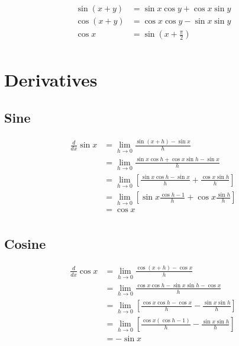 \documentclass[letterpaper, landscape]{exam}
\begin{document}
  \begin{align*}
    \sin(x + y) &= \sin x \cos y + \cos x \sin y \\
    \cos(x + y) &= \cos x \cos y - \sin x \sin y \\
    \cos x &= \sin \left( x + \frac{\pi}{2} \right) \\
  \end{align*}

  \section{Derivatives} %
  
  \subsection{Sine} %
 
  \begin{align*}
    \frac{d}{dx} \sin x & = \lim_{h \to 0} \frac{\sin(x + h) - \sin x}{h} \\
                        & = \lim_{h \to 0} \frac{\sin x \cos h + \cos x \sin h - \sin x}{h} \\
                        & = \lim_{h \to 0} \left[ \frac{\sin x \cos h - \sin x}{h} 
                            + \frac{\cos x \sin h}{h} \right] \\
                        & = \lim_{h \to 0} \left[ \sin x \frac{\cos h - 1}{h} 
                            + \cos x \frac{\sin h}{h} \right] \\
                        & = \cos x \\
  \end{align*}
  
  \subsection{Cosine} %
  \begin{align*}
    \frac{d}{dx} \cos x & = \lim_{h \to 0} \frac{\cos (x + h) - \cos x}{h} \\
                        & = \lim_{h \to 0} \frac{\cos x \cos h - \sin x \sin h - \cos x}{h} \\
                        & = \lim_{h \to 0} \left[ \frac{\cos x \cos h - \cos x}{h} - \frac{\sin x \sin h}{h} \right] \\
                        & = \lim_{h \to 0} \left[ \frac{\cos x (\cos h - 1)}{h} - \frac{\sin x \sin h}{h} \right] \\
                        & = - \sin x \\
  \end{align*}
\end{document}

